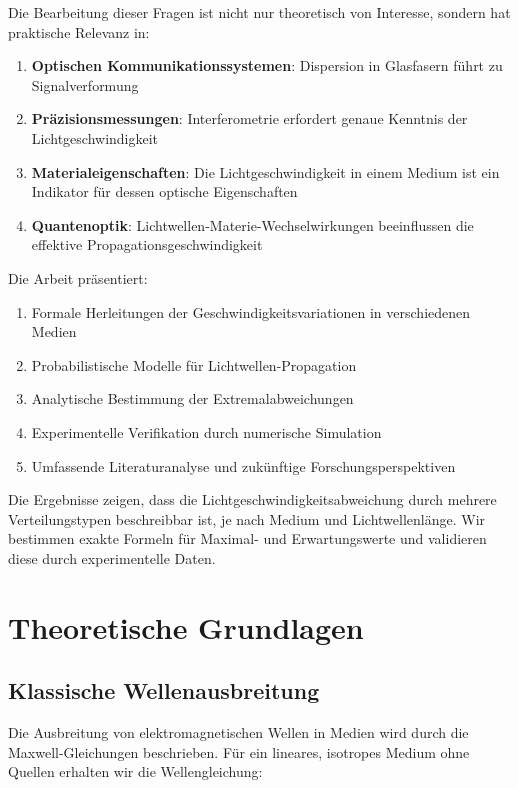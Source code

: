 \documentclass[a4paper,12pt]{article}
\theoremstyle{definition}
\theoremstyle{remark}
\begin{document}
Die Bearbeitung dieser Fragen ist nicht nur theoretisch von Interesse, sondern hat praktische Relevanz in:
\begin{enumerate}
    \item \textbf{Optischen Kommunikationssystemen}: Dispersion in Glasfasern führt zu Signalverformung
    \item \textbf{Präzisionsmessungen}: Interferometrie erfordert genaue Kenntnis der Lichtgeschwindigkeit
    \item \textbf{Materialeigenschaften}: Die Lichtgeschwindigkeit in einem Medium ist ein Indikator für dessen optische Eigenschaften
    \item \textbf{Quantenoptik}: Lichtwellen-Materie-Wechselwirkungen beeinflussen die effektive Propagationsgeschwindigkeit
\end{enumerate}

Die Arbeit präsentiert:
\begin{enumerate}
\item Formale Herleitungen der Geschwindigkeitsvariationen in verschiedenen Medien
\item Probabilistische Modelle für Lichtwellen-Propagation
\item Analytische Bestimmung der Extremalabweichungen
\item Experimentelle Verifikation durch numerische Simulation
\item Umfassende Literaturanalyse und zukünftige Forschungsperspektiven
\end{enumerate}

Die Ergebnisse zeigen, dass die Lichtgeschwindigkeitsabweichung durch mehrere Verteilungstypen beschreibbar ist, je nach Medium und Lichtwellenlänge. Wir bestimmen exakte Formeln für Maximal- und Erwartungswerte und validieren diese durch experimentelle Daten.

\section{Theoretische Grundlagen}

\subsection{Klassische Wellenausbreitung}

Die Ausbreitung von elektromagnetischen Wellen in Medien wird durch die Maxwell-Gleichungen beschrieben. Für ein lineares, isotropes Medium ohne Quellen erhalten wir die Wellengleichung:
\end{document}
